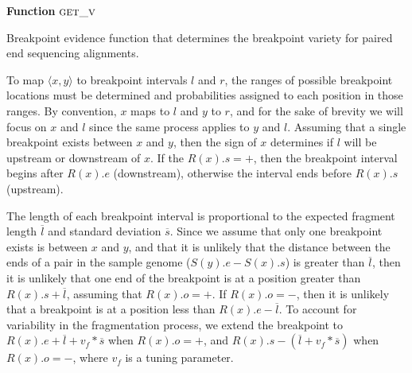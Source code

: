 \documentclass[11pt]{article}
\begin{document}
\begin{algorithm}[H]
    \DontPrintSemicolon
    \footnotesize
    \BlankLine
    \textbf{Function} $\textsc{get\_v}$\;
	\caption{Breakpoint evidence function that determines the breakpoint variety
			 for paired end sequencing alignments.}
    \label{get_v}
\end{algorithm}

To map $\langle x,y \rangle$ to breakpoint intervals $l$ and $r$, the ranges of
possible breakpoint locations must be determined and probabilities assigned to
each position in those ranges.  By convention, $x$ maps to $l$ and $y$ to
$r$, and for the sake of brevity we will focus on $x$ and $l$ since the same
process applies to $y$ and $l$.  Assuming that a single breakpoint exists
between $x$ and $y$, then the sign of $x$ determines if $l$ will be upstream
or downstream of $x$.  If the $R(x).s=+$, then the breakpoint interval begins
after $R(x).e$ (downstream), otherwise the interval ends before $R(x).s$
(upstream).  

The length of each breakpoint interval is proportional to the expected fragment
length $\overline{l}$ and standard deviation $\overline{s}$.  Since we assume
that only one breakpoint exists is between $x$ and $y$, and that it is unlikely
that the distance between the ends of a pair in the sample genome ($S(y).e -
S(x).s$) is greater than $\overline{l}$, then it is unlikely that one end of the
breakpoint is at a position greater than $R(x).s + \overline{l}$, assuming that
$R(x).o=+$. If $R(x).o=-$, then it is unlikely that a breakpoint is at a
position less than $R(x).e - \overline{l}$.  To account for variability in the
fragmentation process, we extend the breakpoint to 
$R(x).e + \overline{l} + v_f*\overline{s}$ when $R(x).o=+$, and 
$R(x).s - (\overline{l} + v_f*\overline{s})$ when $R(x).o=-$, 
where $v_f$ is a tuning parameter.  
\end{document}
